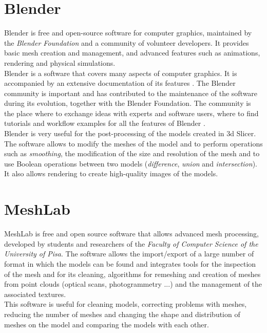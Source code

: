 \section{Blender}
Blender \parencite{Reference32} is free and open-source software for computer graphics, maintained by the \emph{Blender Foundation} and a community of volunteer developers. It provides basic mesh creation and management, and advanced features such as animations, rendering and physical simulations. \\
Blender is a software that covers many aspects of computer graphics. It is accompanied by an extensive documentation of its features \parencite{Reference33}. The Blender community is important and has contributed to the maintenance of the software during its evolution, together with the Blender Foundation. The community is the place where to exchange ideas with experts and software users, where to find tutorials and workflow examples for all the features of Blender \parencite{Reference34}. \\
Blender is very useful for the post-processing of the models created in 3d Slicer. The software allows to modify the meshes of the model and to perform operations such as \emph{smoothing}, the modification of the size and resolution of the mesh and to use Boolean operations between two models (\emph{difference}, \emph{union} and \emph{intersection}). It also allows rendering to create high-quality images of the models.

\section{MeshLab}
MeshLab \parencite{Reference36} is free and open source software that allows advanced mesh processing, developed by students and researchers of the \emph{Faculty of Computer Science of the University of Pisa}. The software allows the import/export of a large number of format in which the models can be found and integrates tools for the inspection of the mesh and for its cleaning, algorithms for remeshing and creation of meshes from point clouds (optical scans, photogrammetry ...) and the management of the associated textures. \\
This software is useful for cleaning models, correcting problems with meshes, reducing the number of meshes and changing the shape and distribution of meshes on the model and comparing the models with each other.

